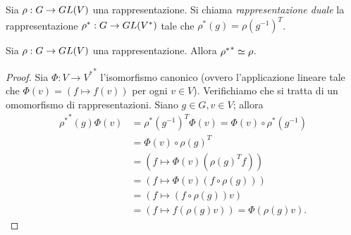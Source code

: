 \begin{definition}
Sia $\rho:G\to GL(V)$ una rappresentazione. Si chiama \emph{rappresentazione duale} la rappresentazione $\rho^*:G\to GL(V^*)$ tale che $\rho^*(g)=\rho(g^{-1})^T$.

\end{definition}

\begin{proposition}
Sia $\rho:G\to GL(V)$ una rappresentazione. Allora ${\rho^*}^*\simeq\rho$.
\end{proposition}
\begin{proof}
Sia $\Phi:V\to{V^*}^*$ l'isomorfismo canonico (ovvero l'applicazione lineare tale che $\Phi(v)=(f\mapsto f(v))$ per ogni $v\in V$). Verifichiamo che si tratta di un omomorfismo di rappresentazioni. Siano $g\in G,v\in V$; allora
\begin{align*}
{\rho^*}^*(g)\Phi(v)&=\rho^*(g^{-1})^T\Phi(v)=\Phi(v)\circ\rho^*(g^{-1})\\
&=\Phi(v)\circ\rho(g)^T\\
&=(f\mapsto\Phi(v)(\rho(g)^Tf))\\
&=(f\mapsto\Phi(v)(f\circ\rho(g)))\\
&=(f\mapsto(f\circ\rho(g))v)\\
&=(f\mapsto f(\rho(g)v))=\Phi(\rho(g)v).
\end{align*}
\end{proof}

